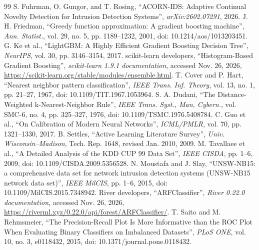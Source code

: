 \begin{thebibliography}{99}
 S. Fuhrman, O. Gungor, and T. Rosing, ``ACORN-IDS: Adaptive Continual Novelty Detection for Intrusion Detection Systems'', \emph{arXiv:2602.07291}, 2026.
 J. H. Friedman, ``Greedy function approximation: A gradient boosting machine'', \emph{Ann. Statist.}, vol. 29, no. 5, pp. 1189--1232, 2001, doi: 10.1214/aos/1013203451.
 G. Ke et al., ``LightGBM: A Highly Efficient Gradient Boosting Decision Tree'', \emph{NeurIPS}, vol. 30, pp. 3146--3154, 2017.
 scikit-learn developers, ``Histogram-Based Gradient Boosting'', \emph{scikit-learn 1.9.1 documentation}, accessed Nov. 26, 2026, \url{https://scikit-learn.org/stable/modules/ensemble.html}.
 T. Cover and P. Hart, ``Nearest neighbor pattern classification'', \emph{IEEE Trans. Inf. Theory}, vol. 13, no. 1, pp. 21--27, 1967, doi: 10.1109/TIT.1967.1053964.
 S. A. Dudani, ``The Distance-Weighted k-Nearest-Neighbor Rule'', \emph{IEEE Trans. Syst., Man, Cybern.}, vol. SMC-6, no. 4, pp. 325--327, 1976, doi: 10.1109/TSMC.1976.5408784.
 C. Guo et al., ``On Calibration of Modern Neural Networks'', \emph{ICML/PMLR}, vol. 70, pp. 1321--1330, 2017.
 B. Settles, ``Active Learning Literature Survey'', \emph{Univ. Wisconsin--Madison}, Tech. Rep. 1648, revised Jan. 2010, 2009.
 M. Tavallaee et al., ``A Detailed Analysis of the KDD CUP 99 Data Set'', \emph{IEEE CISDA}, pp. 1--6, 2009, doi: 10.1109/CISDA.2009.5356528.
 N. Moustafa and J. Slay, ``UNSW-NB15: a comprehensive data set for network intrusion detection systems (UNSW-NB15 network data set)'', \emph{IEEE MilCIS}, pp. 1--6, 2015, doi: 10.1109/MilCIS.2015.7348942.
 River developers, ``ARFClassifier'', \emph{River 0.22.0 documentation}, accessed Nov. 26, 2026, \url{https://riverml.xyz/0.22.0/api/forest/ARFClassifier/}.
 T. Saito and M. Rehmsmeier, ``The Precision-Recall Plot Is More Informative than the ROC Plot When Evaluating Binary Classifiers on Imbalanced Datasets'', \emph{PLoS ONE}, vol. 10, no. 3, e0118432, 2015, doi: 10.1371/journal.pone.0118432.
\end{thebibliography}
